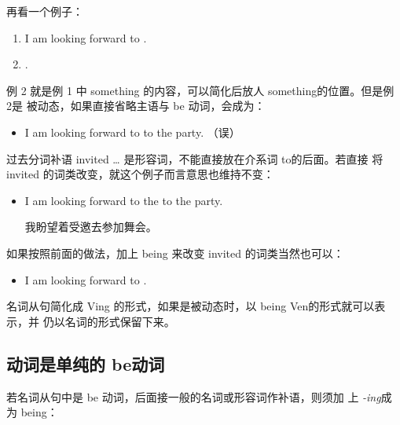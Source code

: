 再看一个例子：
\begin{enumerate}
\item I am looking forward to .
\item {}.
\end{enumerate}
例 2 就是例 1 中 something 的内容，可以简化后放人 something的位置。但是例 2是
被动态，如果直接省略主语与 be 动词，会成为：
\begin{itemize}
\item I am looking forward to  to the party. （误）
\end{itemize}
过去分词补语 invited \ldots{} 是形容词，不能直接放在介系词 to的后面。若直接
将 invited 的词类改变，就这个例子而言意思也维持不变：
\begin{itemize}
\item I am looking forward to the  to the party.

  我盼望着受邀去参加舞会。
\end{itemize}

如果按照前面的做法，加上 being 来改变 invited 的词类当然也可以：
\begin{itemize}
\item I am looking forward to .
\end{itemize}

名词从句简化成 Ving 的形式，如果是被动态时，以 being Ven的形式就可以表示，并
仍以名词的形式保留下来。

\subsection{动词是单纯的 be动词}

若名词从句中是 be 动词，后面接一般的名词或形容词作补语，则须加
上 \emph{-ing}成为 being：

